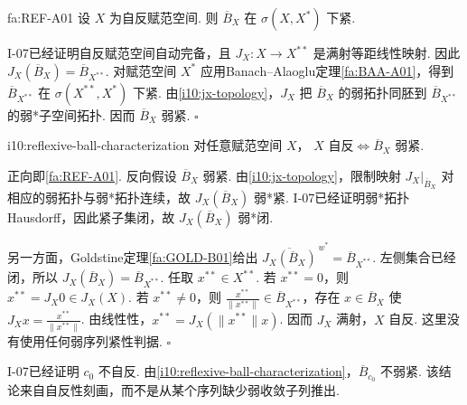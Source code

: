 \begin{FATheorem}[A][自反空间闭单位球弱紧]{fa:REF-A01}
设 \(\displaystyle X\) 为自反赋范空间. 则 \(\displaystyle \overline B_X\) 在 \(\displaystyle \sigma(X,X^*)\) 下紧.
\end{FATheorem}

\begin{FAProof}
I-07已经证明自反赋范空间自动完备，且 \(\displaystyle J_X:X\to X^{**}\) 是满射等距线性映射. 因此
\(\displaystyle J_X(\overline B_X)=\overline B_{X^{**}}\).
对赋范空间 \(\displaystyle X^*\) 应用Banach--Alaoglu定理\autoref{fa:BAA-A01}，得到 \(\displaystyle \overline B_{X^{**}}\) 在 \(\displaystyle \sigma(X^{**},X^*)\) 下紧. 由\autoref{i10:jx-topology}，\(\displaystyle J_X\) 把 \(\displaystyle \overline B_X\) 的弱拓扑同胚到 \(\displaystyle \overline B_{X^{**}}\) 的弱*子空间拓扑. 因而 \(\displaystyle \overline B_X\) 弱紧.
\hfill\(\square\)
\end{FAProof}

\begin{FACorollary}[A][闭单位球弱紧刻画自反性]{i10:reflexive-ball-characterization}
对任意赋范空间 \(\displaystyle X\)，
\(\displaystyle X\text{ 自反} \iff \overline B_X\text{ 弱紧}\).
\end{FACorollary}

\begin{FAProof}
正向即\autoref{fa:REF-A01}. 反向假设 \(\displaystyle \overline B_X\) 弱紧. 由\autoref{i10:jx-topology}，限制映射 \(\displaystyle J_X|_{\overline B_X}\) 对相应的弱拓扑与弱*拓扑连续，故 \(\displaystyle J_X(\overline B_X)\) 弱*紧. I-07已经证明弱*拓扑Hausdorff，因此紧子集闭，故 \(\displaystyle J_X(\overline B_X)\) 弱*闭.

另一方面，Goldstine定理\autoref{fa:GOLD-B01}给出
\(\displaystyle \overline{J_X(\overline B_X)}^{\,w^*} = \overline B_{X^{**}}\).
左侧集合已经闭，所以
\(\displaystyle J_X(\overline B_X)=\overline B_{X^{**}}\).
任取 \(\displaystyle x^{**}\in X^{**}\). 若 \(\displaystyle x^{**}=0\)，则 \(\displaystyle x^{**}=J_X0\in J_X(X)\). 若 \(\displaystyle x^{**}\neq0\)，则 \(\displaystyle \frac{x^{**}}{\|x^{**}\|}\in\overline B_{X^{**}}\)，存在 \(\displaystyle x\in\overline B_X\) 使 \(\displaystyle J_Xx=\frac{x^{**}}{\|x^{**}\|}\). 由线性性，\(\displaystyle x^{**}=J_X(\|x^{**}\|x)\). 因而 \(\displaystyle J_X\) 满射，\(\displaystyle X\) 自反. 这里没有使用任何弱序列紧性判据.
\hfill\(\square\)
\end{FAProof}

\begin{FACounterexample}[闭单位球不弱紧]
I-07已经证明 \(\displaystyle c_0\) 不自反. 由\autoref{i10:reflexive-ball-characterization}，\(\displaystyle \overline B_{c_0}\) 不弱紧. 该结论来自自反性刻画，而不是从某个序列缺少弱收敛子列推出.
\end{FACounterexample}

